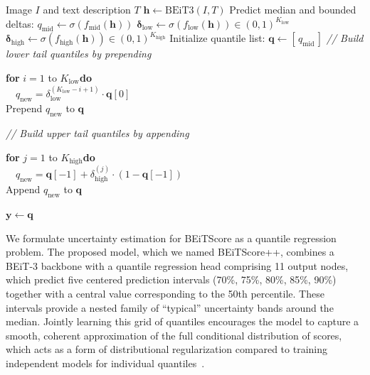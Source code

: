 \documentclass[11pt]{article}
\begin{document}
\begin{algorithm}[t]
\caption{Monotone quantile construction for uncertainty-aware predictions in BEiTScore++}
\label{alg:monotone_quantiles}
\begin{algorithmic}[1]
\Require Image $I$ and text description $T$
\State $\mathbf{h} \gets \mathrm{BEiT3}(I, T)$
\State Predict median and bounded deltas:
\State \hspace{0.5cm} $q_{\mathrm{mid}} \gets \sigma(f_{\mathrm{mid}}(\mathbf{h}))$
\State \hspace{0.5cm} $\boldsymbol{\delta}_{\mathrm{low}} \gets \sigma(f_{\mathrm{low}}(\mathbf{h})) \in (0,1)^{K_{\mathrm{low}}}$
\State \hspace{0.5cm} $\boldsymbol{\delta}_{\mathrm{high}} \gets \sigma(f_{\mathrm{high}}(\mathbf{h})) \in (0,1)^{K_{\mathrm{high}}}$
\State Initialize quantile list: $\mathbf{q} \gets [\,q_{\mathrm{mid}}\,]$
\Statex \textit{// Build lower tail quantiles by prepending} 

\State \textbf{for }{$i = 1$ to $K_{\mathrm{low}}$}\textbf{do } \\
    $\quad q_{\mathrm{new}} = \delta_{\mathrm{low}}^{(K_{\mathrm{low}}-i+1)} \cdot \mathbf{q}[0]$ \\
    \hspace{0.3cm} Prepend $q_{\mathrm{new}}$ to $\mathbf{q}$

\Statex \textit{// Build upper tail quantiles by appending}

\State \textbf{for }{$j = 1$ to $K_{\mathrm{high}}$}\textbf{do } \\
    $\quad q_{\mathrm{new}} = \mathbf{q}[-1] + \delta_{\mathrm{high}}^{(j)} \cdot (1 - \mathbf{q}[-1])$ \\
    \hspace{0.3cm} Append $q_{\mathrm{new}}$ to $\mathbf{q}$

\State \Return $\mathbf{y} \gets \mathbf{q}$
\end{algorithmic}
\end{algorithm}

We formulate uncertainty estimation for BEiTScore as a quantile regression problem. The proposed model, which we named BEiTScore++, combines a BEiT-3 backbone with a quantile regression head comprising 11 output nodes, which predict five centered prediction intervals (70\%, 75\%, 80\%, 85\%, 90\%) together with a central value corresponding to the 50th percentile. These intervals provide a nested family of ``typical'' uncertainty bands around the median. Jointly learning this grid of quantiles encourages the model to capture a smooth, coherent approximation of the full conditional distribution of scores, which acts as a form of distributional regularization compared to training independent models for individual quantiles~\cite{narayan2021regularization}. 
\end{document}
